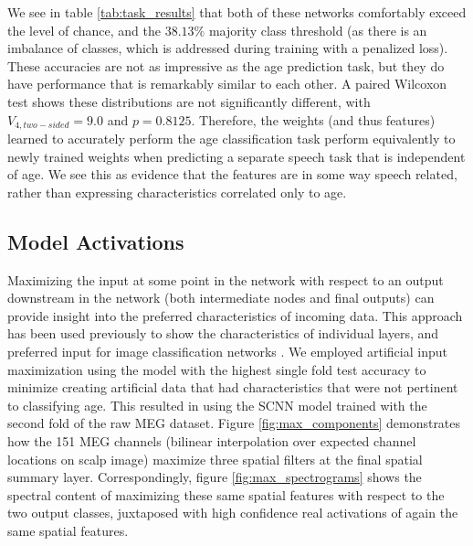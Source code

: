 \documentclass[fleqn,10pt]{wlscirep}
\begin{document}
We see in table \ref{tab:task_results} that both of these networks comfortably exceed the level of chance, and the $38.13\%$ majority class threshold (as there is an imbalance of classes, which is addressed during training with a penalized loss). These accuracies are not as impressive as the age prediction task, but they do have performance that is remarkably similar to each other. A paired Wilcoxon test shows these distributions are not significantly different, with $V_{4, two-sided}=9.0$ and $p=0.8125$. Therefore, the weights (and thus features) learned to accurately perform the age classification task perform equivalently to newly trained weights when predicting a separate speech task that is independent of age. We see this as evidence that the features are in some way speech related, rather than expressing characteristics correlated only to age.

\subsection*{Model Activations}

Maximizing the input at some point in the network with respect to an output downstream in the network (both intermediate nodes and final outputs) can provide insight into the preferred characteristics of incoming data. This approach has been used previously to show the characteristics of individual layers, and preferred input for image classification networks \cite{Yosinski2015}. We employed artificial input maximization using the model with the highest single fold test accuracy to minimize creating artificial data that had characteristics that were not pertinent to classifying age. This resulted in using the SCNN model trained with the second fold of the raw MEG dataset. Figure \ref{fig:max_components} demonstrates how the 151 MEG channels (bilinear interpolation over expected channel locations on scalp image)  maximize three spatial filters at the final spatial summary layer. Correspondingly, figure \ref{fig:max_spectrograms} shows the spectral content of maximizing these same spatial features with respect to the two output classes, juxtaposed with high confidence real activations of again the same spatial features.
\end{document}
